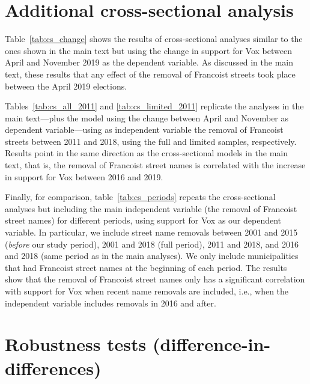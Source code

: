 \documentclass[12pt, titlepage]{article}
\begin{document}
\clearpage
\section{Additional cross-sectional analysis}

Table~\ref{tab:cs_change} shows the results of cross-sectional analyses similar to the ones shown in the main text but using the change in support for Vox between April and November 2019 as the dependent variable.
As discussed in the main text, these results that any effect of the removal of Francoist streets took place between the April 2019 elections.



Tables~\ref{tab:cs_all_2011} and \ref{tab:cs_limited_2011} replicate the analyses in the main text---plus the model using the change between April and November as dependent variable---using as independent variable the removal of Francoist streets between 2011 and 2018, using the full and limited samples, respectively.
Results point in the same direction as the cross-sectional models in the main text, that is, the removal of Francoist street names is correlated with the increase in support for Vox between 2016 and 2019.




Finally, for comparison, table~\ref{tab:cs_periods} repeats the cross-sectional analyses but including the main independent variable (the removal of Francoist street names) for different periods, using support for Vox as our dependent variable.
In particular, we include street name removals between 2001 and 2015 (\textit{before} our study period), 2001 and 2018 (full period), 2011 and 2018, and 2016 and 2018 (same period as in the main analyses).
We only include municipalities that had Francoist street names at the beginning of each period.
The results show that the removal of Francoist street names only has a significant correlation with support for Vox when recent name removals are included, i.e., when the independent variable includes removals in 2016 and after.



\clearpage
\section{Robustness tests (difference-in-differences)}
\end{document}
